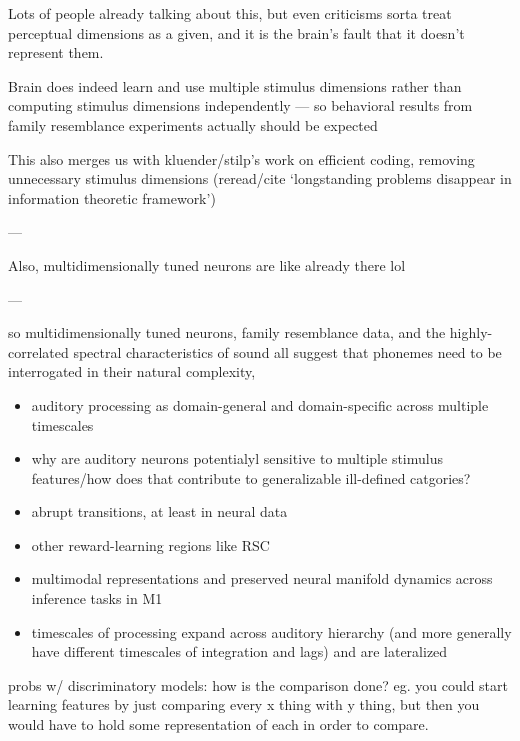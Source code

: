 \begin{multicols}{2}
Lots of people already talking about this, but even criticisms sorta treat perceptual dimensions as a given, and it is the brain's fault that it doesn't represent them. \cite{goddardInterpretingDimensionsNeural2018a}

Brain does indeed learn and use multiple stimulus dimensions rather than computing stimulus dimensions independently --- so behavioral results from family resemblance experiments actually should be expected\cite{macellaioWhySensoryNeurons2020}

This also merges us with kluender/stilp's work on efficient coding, removing unnecessary stimulus dimensions (reread/cite `longstanding problems disappear in information theoretic framework')

---

Also, multidimensionally tuned neurons are like already there lol

---

so multidimensionally tuned neurons, family resemblance data, and the highly-correlated spectral characteristics of sound all suggest that phonemes need to be interrogated in their natural complexity, 

\begin{itemize}
\item auditory processing as domain-general and domain-specific across multiple timescales \cite{norman-haignereHierarchicalIntegrationMultiple2020}
\item why are auditory neurons potentialyl sensitive to multiple stimulus features/how does that contribute to generalizable ill-defined catgories? \cite{macellaioWhySensoryNeurons2020}
\item abrupt transitions, at least in neural data \cite{durstewitzAbruptTransitionsPrefrontal2010}
\item other reward-learning regions like RSC \cite{millerRetrosplenialCorticalRepresentations2019}
\item multimodal representations and preserved neural manifold dynamics across inference tasks in M1 \cite{gallegoCorticalPopulationActivity2018}
\item timescales of processing expand across auditory hierarchy (and more generally have different timescales of integration and lags) \cite{norman-haignereHierarchicalIntegrationMultiple2020} and are lateralized \cite{levyCircuitAsymmetriesUnderlie2019a}
\end{itemize}

probs w/ discriminatory models: how is the comparison done? eg. you could start learning features by just comparing every x thing with y thing, but then you would have to hold some representation of each in order to compare. 


\end{multicols}
